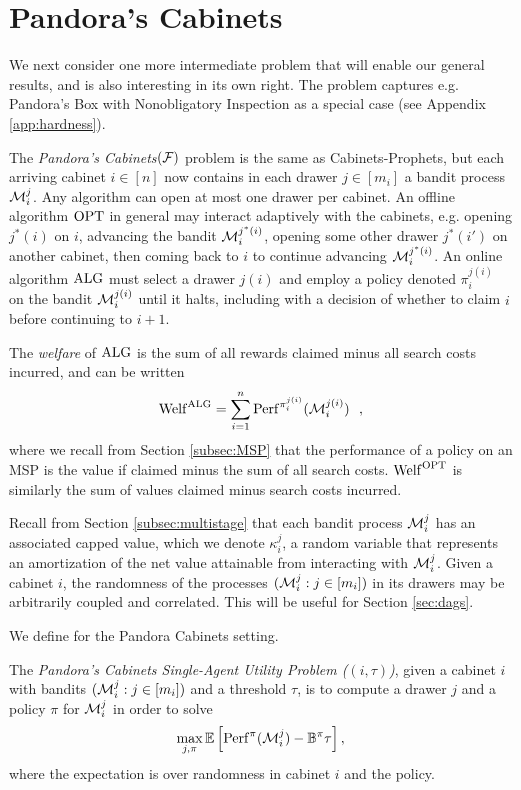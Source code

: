 \section{Pandora's Cabinets} \label{sec:cabinets}

We next consider one more intermediate problem that will enable our general results, and is also interesting in its own right.
The problem captures e.g. Pandora's Box with Nonobligatory Inspection as a special case (see Appendix \ref{app:hardness}).

The \emph{Pandora's Cabinets$(\mathcal{F})$} problem is the same as Cabinets-Prophets, but each arriving cabinet $i \in [n]$ now contains in each drawer $j \in [m_i]$ a bandit process $\mathcal{M}_i^j$.
Any algorithm can open at most one drawer per cabinet.
An offline algorithm $\mathrm{OPT}$ in general may interact adaptively with the cabinets, e.g. opening $j^*(i)$ on $i$, advancing the bandit $\mathcal{M}_i^{j^*(i)}$, opening some other drawer $j^*(i')$ on another cabinet, then coming back to $i$ to continue advancing $\mathcal{M}_i^{j^*(i)}$.
An online algorithm $\mathrm{ALG}$ must select a drawer $j(i)$ and employ a policy denoted $\pi_i^{j(i)}$ on the bandit $\mathcal{M}_i^{j(i)}$ until it halts, including with a decision of whether to claim $i$ before continuing to $i+1$.

The \emph{welfare} of $\mathrm{ALG}$ is the sum of all rewards claimed minus all search costs incurred, and can be written
  \[ \mathrm{Welf}^{\mathrm{ALG}} = \sum_{i=1}^n \mathrm{Perf}^{\pi_i^{j(i)}}(\mathcal{M}_i^{j(i)})~~, \]
where we recall from Section \ref{subsec:MSP} that the performance of a policy on an MSP is the value if claimed minus the sum of all search costs.
$\mathrm{Welf}^{\mathrm{OPT}}$ is similarly the sum of values claimed minus search costs incurred.

Recall from Section \ref{subsec:multistage} that each bandit process $\mathcal{M}_i^j$ has an associated capped value, which we denote $\kappa_i^j$, a random variable that represents an amortization of the net value attainable from interacting with $\mathcal{M}_i^j$.
Given a cabinet $i$, the randomness of the processes $(\mathcal{M}_i^j : j \in [m_i])$ in its drawers may be arbitrarily coupled and correlated.
This will be useful for Section \ref{sec:dags}.



We define \SAUP{} for the Pandora Cabinets setting.
\begin{definition} \label{def:pcsaup}
	  The \emph{Pandora's Cabinets Single-Agent Utility Problem (\SAUP$(i,\tau)$)}, given a cabinet $i$ with bandits $(\mathcal{M}_i^j : j \in [m_i])$ and a threshold $\tau$, is to compute a drawer $j$ and a policy $\pi$ for $\mathcal{M}_i^{j}$ in order to solve
	  \begin{align}
		    \max_{j,\pi} \operatorname*{\mathbb{E}} \left[ \mathrm{Perf}^{\pi}(\mathcal{M}_i^j) - \mathbb{B}^{\pi} \tau \right] , \label{eq:pcsaup}
		  \end{align}
	  where the expectation is over randomness in cabinet $i$ and the policy.
\end{definition}


